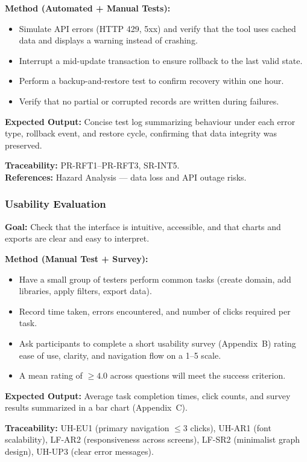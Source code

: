 \documentclass[12pt, titlepage]{article}
\begin{document}
\textbf{Method (Automated + Manual Tests):}
\begin{itemize}
  \item Simulate API errors (HTTP 429, 5xx) and verify that the tool uses cached data and displays a warning instead of crashing.
  \item Interrupt a mid-update transaction to ensure rollback to the last valid state.
  \item Perform a backup-and-restore test to confirm recovery within one hour.
  \item Verify that no partial or corrupted records are written during failures.
\end{itemize}

\textbf{Expected Output:} Concise test log summarizing behaviour under each error type, rollback event, and restore cycle, confirming that data integrity was preserved.

\textbf{Traceability:} PR-RFT1--PR-RFT3, SR-INT5.\\
\textbf{References:} Hazard Analysis --- data loss and API outage risks.

\subsubsection{Usability Evaluation}
\label{subsubsec:usability}

\textbf{Goal:} Check that the interface is intuitive, accessible, and that charts and exports are clear and easy to interpret.

\textbf{Method (Manual Test + Survey):}
\begin{itemize}
  \item Have a small group of testers perform common tasks (create domain, add libraries, apply filters, export data).
  \item Record time taken, errors encountered, and number of clicks required per task.
  \item Ask participants to complete a short usability survey (Appendix~B) rating ease of use, clarity, and navigation flow on a 1--5 scale.
  \item A mean rating of \(\ge 4.0\) across questions will meet the success criterion.
\end{itemize}

\textbf{Expected Output:} Average task completion times, click counts, and survey results summarized in a bar chart (Appendix~C).

\textbf{Traceability:} UH-EU1 (primary navigation \(\le 3\) clicks), UH-AR1 (font scalability), LF-AR2 (responsiveness across screens), LF-SR2 (minimalist graph design), UH-UP3 (clear error messages).
\end{document}
